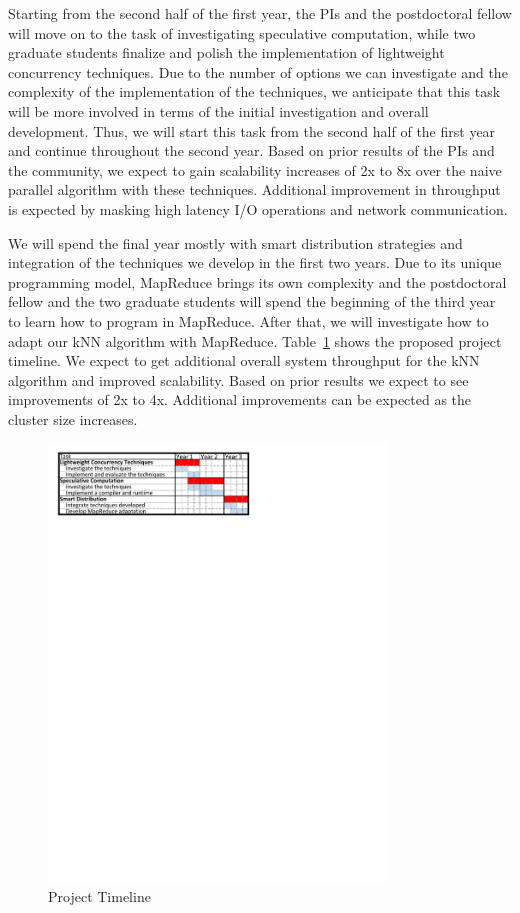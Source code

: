 \documentclass[times,11pt]{article}
\begin{document}
Starting from the second half of the first year, the PIs and the postdoctoral
fellow will move on to the task of investigating speculative computation, while
two graduate students finalize and polish the implementation of lightweight
concurrency techniques. Due to the number of options we can investigate and the
complexity of the implementation of the techniques, we anticipate that this task
will be more involved in terms of the initial investigation and overall
development. Thus, we will start this task from the second half of the first
year and continue throughout the second year. Based on prior results of
the PIs and the community, we expect to gain scalability increases of
2x to 8x over the naive parallel algorithm with these techniques. Additional
improvement in throughput is expected by masking high latency I/O operations and network
communication. 

We will spend the final year mostly with smart distribution strategies and
integration of the techniques we develop in the first two years. Due to its
unique programming model, MapReduce brings its own complexity and the
postdoctoral fellow and the two graduate students will spend the beginning of
the third year to learn how to program in MapReduce. After that, we will
investigate how to adapt our kNN algorithm with MapReduce. Table~\ref{timeline}
shows the proposed project timeline. We expect to get additional overall
system throughput for the kNN algorithm and improved scalability. Based on
prior results we expect to see improvements of 2x to 4x.  Additional
improvements can be expected as the cluster size increases.

\begin{figure}[!tp]
\centering
\includegraphics[width=0.80\textwidth]{schedule.pdf}
\caption{Project Timeline}
\label{timeline}
\end{figure}
\end{document}
